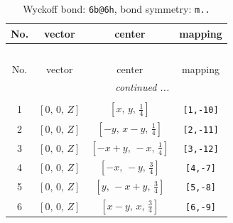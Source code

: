 \documentclass[fleqn,8pt]{jsarticle}
\begin{document}
\begin{longtable}{cccc}
\caption{Wyckoff bond: {\tt 6b@6h}, bond symmetry: {\tt m..}}
 \\
 \hline \hline
No. & vector & center & mapping \\ \hline \endfirsthead

\multicolumn{3}{l}{\tablename\ \thetable{}} \\
 \hline \hline
No. & vector & center & mapping \\ \hline \endhead

 \hline \hline
\multicolumn{3}{r}{\footnotesize\it continued ...} \\ \endfoot

 \hline \hline
\multicolumn{3}{r}{} \\ \endlastfoot

1 & $\left[ 0,\, 0,\, Z \right]$ & $\left[ x,\, y,\, \frac{1}{4} \right]$ & {\tt [1,-10]} \\ \hline
2 & $\left[ 0,\, 0,\, Z \right]$ & $\left[ - y,\, x - y,\, \frac{1}{4} \right]$ & {\tt [2,-11]} \\ \hline
3 & $\left[ 0,\, 0,\, Z \right]$ & $\left[ - x + y,\, - x,\, \frac{1}{4} \right]$ & {\tt [3,-12]} \\ \hline
4 & $\left[ 0,\, 0,\, Z \right]$ & $\left[ - x,\, - y,\, \frac{3}{4} \right]$ & {\tt [4,-7]} \\ \hline
5 & $\left[ 0,\, 0,\, Z \right]$ & $\left[ y,\, - x + y,\, \frac{3}{4} \right]$ & {\tt [5,-8]} \\ \hline
6 & $\left[ 0,\, 0,\, Z \right]$ & $\left[ x - y,\, x,\, \frac{3}{4} \right]$ & {\tt [6,-9]} \\
\end{longtable}
\renewcommand{\arraystretch}{1.2}
\end{document}
